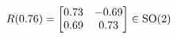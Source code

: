 \documentclass[preview]{standalone}
\begin{document}
\begin{align*}
\special{dvisvgm:raw <g id='unique000'>}R(0.76) = \begin{bmatrix} 0.73 & -0.69 \\ 0.69 & 0.73 \end{bmatrix} \in \text{SO}(2)\special{dvisvgm:raw </g>}
\end{align*}
\end{document}
